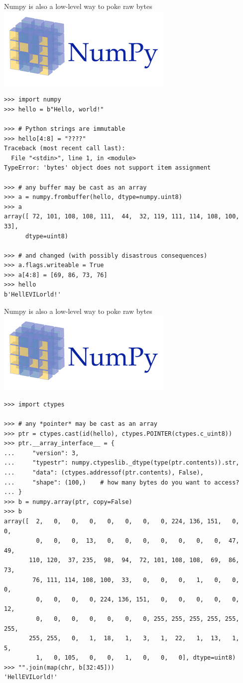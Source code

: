 \documentclass[aspectratio=169]{beamer}
\begin{document}
\begin{frame}[fragile]{Numpy is also a low-level way to poke raw bytes}
\vspace{0.5 cm}
\hfill \includegraphics[height=1.5 cm]{numpy-logo.png}

\scriptsize
\vspace{-1.5 cm}
\begin{verbatim}
>>> import numpy
>>> hello = b"Hello, world!"

>>> # Python strings are immutable
>>> hello[4:8] = "????"
Traceback (most recent call last):
  File "<stdin>", line 1, in <module>
TypeError: 'bytes' object does not support item assignment

>>> # any buffer may be cast as an array
>>> a = numpy.frombuffer(hello, dtype=numpy.uint8)
>>> a
array([ 72, 101, 108, 108, 111,  44,  32, 119, 111, 114, 108, 100,  33],
      dtype=uint8)

>>> # and changed (with possibly disastrous consequences)
>>> a.flags.writeable = True
>>> a[4:8] = [69, 86, 73, 76]
>>> hello
b'HellEVILorld!'
\end{verbatim}
\end{frame}

\begin{frame}[fragile]{Numpy is also a low-level way to poke raw bytes}
\vspace{0.5 cm}
\hfill \includegraphics[height=1.5 cm]{numpy-logo.png}

\scriptsize
\vspace{-1.7 cm}
\begin{verbatim}
>>> import ctypes

>>> # any *pointer* may be cast as an array
>>> ptr = ctypes.cast(id(hello), ctypes.POINTER(ctypes.c_uint8))
>>> ptr.__array_interface__ = {
...     "version": 3,
...     "typestr": numpy.ctypeslib._dtype(type(ptr.contents)).str,
...     "data": (ctypes.addressof(ptr.contents), False),
...     "shape": (100,)    # how many bytes do you want to access?
... }
>>> b = numpy.array(ptr, copy=False)
>>> b
array([  2,   0,   0,   0,   0,   0,   0,   0, 224, 136, 151,   0,   0,
         0,   0,   0,  13,   0,   0,   0,   0,   0,   0,   0,  47,  49,
       110, 120,  37, 235,  98,  94,  72, 101, 108, 108,  69,  86,  73,
        76, 111, 114, 108, 100,  33,   0,   0,   0,   1,   0,   0,   0,
         0,   0,   0,   0, 224, 136, 151,   0,   0,   0,   0,   0,  12,
         0,   0,   0,   0,   0,   0,   0, 255, 255, 255, 255, 255, 255,
       255, 255,   0,   1,  18,   1,   3,   1,  22,   1,  13,   1,   5,
         1,   0, 105,   0,   0,   1,   0,   0,   0], dtype=uint8)
>>> "".join(map(chr, b[32:45]))
'HellEVILorld!'
\end{verbatim}
\end{frame}
\end{document}
